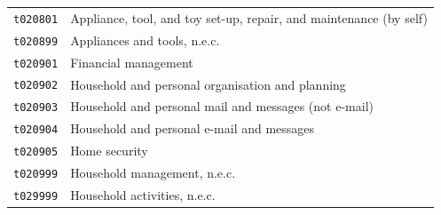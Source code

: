 \documentclass[11pt, a4paper]{article}
\begin{document}
\begin{longtable}{L{3cm} L{13cm}}
\texttt{t020801} & Appliance, tool, and toy set-up, repair, and maintenance (by self) \\
 \texttt{t020899} & Appliances and tools, n.e.c. \\
\texttt{t020901} & Financial management \\
 \texttt{t020902} & Household and personal organisation and planning \\
\texttt{t020903} & Household and personal mail and messages (not e-mail) \\
 \texttt{t020904} & Household and personal e-mail and messages \\
\texttt{t020905} & Home security \\
 \texttt{t020999} & Household management, n.e.c. \\
\texttt{t029999} & Household activities, n.e.c. \\
\end{longtable}
\end{document}
